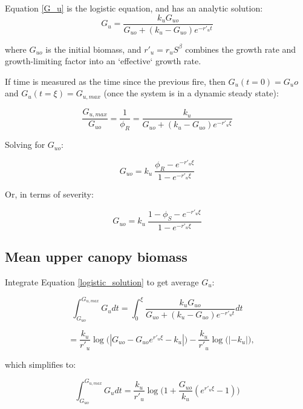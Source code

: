 \documentclass[12pt]{article}
\begin{document}
Equation \ref{G_u}  is the logistic equation, and  has an analytic solution:
\begin{equation}
    G_u = \frac{k_u G_{uo}}{G_{uo} +(k_u-G_{uo}) e^{-r'_u t}}
    \label{logistic_solution}
\end{equation}

where  $G_{uo}$  is the initial biomass, and $r'_u =  r_u S^\beta  $  combines the growth rate and growth-limiting factor into an `effective` growth rate.  

If time is measured as the time since the previous fire, then $G_u(t = 0) = G_uo$ and  $G_u(t = \xi) = G_{u,max}$  (once the system is in a dynamic steady state):

\begin{equation}
    \frac{G_{u,max}}{G_{uo}} = \frac{1}{\phi_R} =  \frac{k_u }{G_{uo} +(k_u-G_{uo}) e^{-r'_u \xi}}
\end{equation}

 Solving for $G_{uo}$:
 
\begin{equation}
  G_{uo} =  k_u \  \frac{\phi_R - e^{-r'_u \xi} }{1 - e^{-r'_u \xi}}
\end{equation}

Or, in terms of severity:

\begin{equation}
  G_{uo} =  k_u \   \frac{1- \phi_S - e^{-r'_u \xi} }{1 - e^{-r'_u \xi}}
  \label{G_uo}
\end{equation}

\subsection*{Mean upper canopy biomass}

Integrate Equation \ref{logistic_solution} to get average $G_u$:

\begin{equation*}
 \int_{G_{uo}}^{G_{u,max}} G_u dt = 
 \int_{0}^\xi \frac{k_u G_{uo}}{G_{uo} +(k_u-G_{uo}) e^{- r'_u t}}dt
\end{equation*}

\begin{equation*}
 \quad  =\frac{k_u}{r'_u}\log \big(| G_{uo} - G_{uo} e^{r'_u\xi}  - k_u | \big)
  - \frac{k_u}{r'_u}\log \big(|  - k_u | \big),
\end{equation*}


which simplifies to:

\begin{equation*}
 \int_{G_{uo}}^{G_{u,max}} G_u dt =
 		 \frac{k_u}{r'_u}\log \big(1 + \frac{G_{uo}}{k_u}( e^{r'_u \xi}-1)\big)
\end{equation*}
\end{document}
